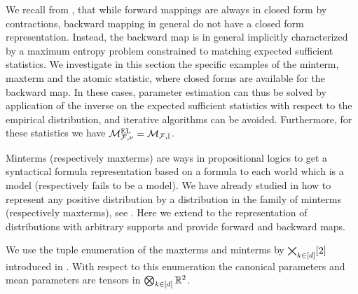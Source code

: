 We recall from , that while forward mappings are always in closed form by contractions, backward mapping in general do not have a closed form representation.
Instead, the backward map is in general implicitly characterized by a maximum entropy problem constrained to matching expected sufficient statistics.
We investigate in this section the specific examples of the minterm, maxterm and the atomic statistic, where closed forms are available for the backward map.
In these cases, parameter estimation can thus be solved by application of the inverse on the expected sufficient statistics with respect to the empirical distribution, and iterative algorithms can be avoided.
Furthermore, for these statistics we have $\mathcal{M}^{\mathrm{EL}}_{\mathcal{F},\nu}=\mathcal{M}_{\mathcal{F},\mathbb{I}}$.


Minterms (respectively maxterms) are ways in propositional logics to get a syntactical formula representation based on a formula to each world which is a model (respectively fails to be a model).
We have already studied in  how to represent any positive distribution by a distribution in the family of minterms (respectively maxterms), see .
Here we extend to the representation of distributions with arbitrary supports and provide forward and backward maps.

We use the tuple enumeration of the maxterms and minterms by $\bigtimes_{k\in[d]}[2]$ introduced in .
With respect to this enumeration the canonical parameters and mean parameters are tensors in $\bigotimes_{k\in[d]}\mathbb{R}^2$.


